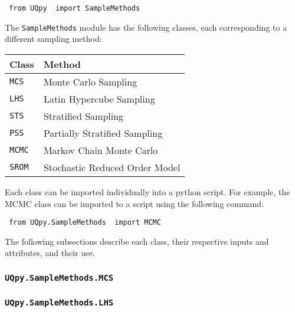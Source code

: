 \documentclass[./UsersGuide.tex]{subfiles}
\begin{document}
\vspace{4mm}
\texttt{{\color{blue} from} \texttt{UQpy} {\color{blue} import} SampleMethods }
\vspace{4mm}

\noindent
The \texttt{SampleMethods} module has the following classes, each corresponding to a different sampling method:

\vspace{4mm}
\begin{center}
	\begin{tabular}{ |l|l| } 
		\hline
		\textbf{Class} &  \textbf{Method} \\
		\hline
		\texttt{MCS}&  Monte Carlo Sampling  \\ 
		\hline
		\texttt{LHS}&  Latin Hypercube Sampling  \\ 
		\hline
		\texttt{STS}&  Stratified Sampling  \\ 
		\hline
		\texttt{PSS}&  Partially Stratified Sampling  \\ 
		\hline
		\texttt{MCMC}&  Markov Chain Monte Carlo  \\ 
		\hline
		\texttt{SROM}&  Stochastic Reduced Order Model  \\ 
		\hline
	\end{tabular}
\end{center}
\vspace{4mm}

\noindent
Each class can be imported individually into a python script. For example, the MCMC class can be imported to a script using the following command:

\vspace{4mm}
\texttt{{\color{blue} from} \texttt{UQpy.SampleMethods} {\color{blue} import} MCMC}
\vspace{4mm}

\noindent
The following subsections describe each class, their respective inputs and attributes, and their use.


\subsubsection{\texttt{UQpy.SampleMethods.MCS}}


\subsubsection{\texttt{UQpy.SampleMethods.LHS}}
\end{document}
